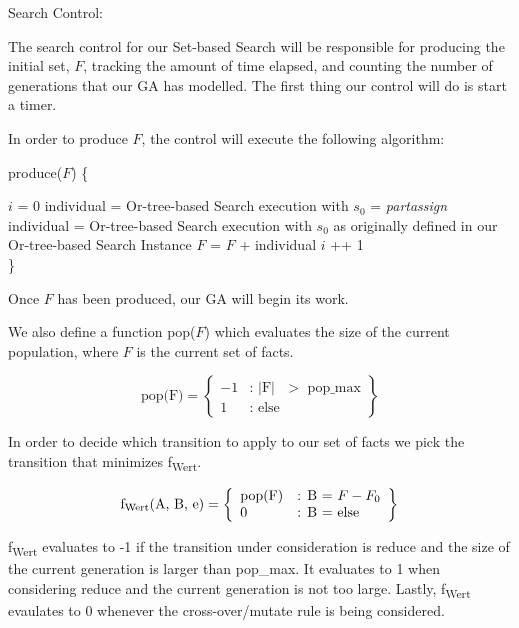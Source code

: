 \documentclass[11pt, oneside]{article}   	%
\begin{document}
\noindent Search Control:

\noindent The search control for our Set-based Search will be responsible for producing the initial set, $F$, tracking the amount of time elapsed, and counting the number of generations that our GA has modelled. The first thing our control will do is start a timer.

\noindent In order to produce $F$, the control will execute the following algorithm:

\noindent produce($F$) \{
\begin{algorithmic}[\textfloatsep = 0pt]
    \STATE $i$ = 0
		\STATE individual = Or-tree-based Search execution with $s_0$ = \textit{partassign}
	\ELSE
		\STATE individual = Or-tree-based Search execution with $s_0$ as originally defined in our Or-tree-based Search Instance
	\ENDIF
	\STATE $F$ = $F$ + individual
	\STATE $i$ ++ 1
    \ENDWHILE \\ \}
\end{algorithmic}

\noindent Once $F$ has been produced, our GA will begin its work.

\noindent We also define a function pop($F$) which evaluates the size of the current population, where $F$ is the current set of facts.
 
     \[
         \text{pop(F)} = \left\{\begin{array}{ll}
             -1 & \text{: $\vert$F$\vert$ $>$ pop_max}\\
             1 & \text{: else}
             \end{array}\right\}
       \]

\noindent In order to decide which transition to apply to our set of facts we pick the transition that minimizes f\textsubscript{Wert}.
 
     \[
         \text{f\textsubscript{Wert}(A, B, e)} = \left\{\begin{array}{ll}
             \text{pop(F)} & \text{: B = $F - F_0$}\\
             0 & \text{: B = else }
             \end{array}\right\}
       \]

\noindent f\textsubscript{Wert} evaluates to -1 if the transition under consideration is reduce and the size of the current generation is larger than pop_max.
It evaluates to 1 when considering reduce and the current generation is not too large.
Lastly, f\textsubscript{Wert} evaulates to 0 whenever the cross-over/mutate rule is being considered.
\end{document}

